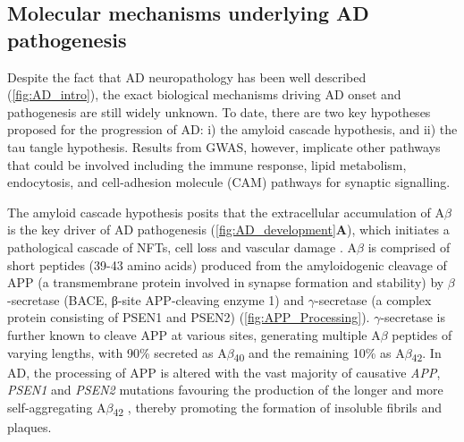 \subsection{Molecular mechanisms underlying AD pathogenesis}
\label{aetiologyAD}
Despite the fact that AD neuropathology has been well described (\cref{fig:AD_intro}), the exact biological mechanisms driving AD onset and pathogenesis are still widely unknown. To date, there are two key hypotheses proposed for the progression of AD: i) the amyloid cascade hypothesis, and ii) the tau tangle hypothesis. Results from GWAS, however, implicate other pathways that could be involved including the immune response, lipid metabolism, endocytosis, and cell-adhesion molecule (CAM) pathways for synaptic signalling.  

The amyloid cascade hypothesis posits that the extracellular accumulation of A$\beta$ is the key driver of AD pathogenesis (\cref{fig:AD_development}\textbf{A}), which initiates a pathological cascade of NFTs, cell loss and vascular damage \cite{Hardy1992}. A$\beta$ is comprised of short peptides (39-43 amino acids) \cite{J1987} produced from the amyloidogenic cleavage of APP (a transmembrane protein involved in synapse formation and stability) by $\beta$-secretase (BACE, β-site APP-cleaving enzyme 1) and $\gamma$-secretase (a complex protein consisting of PSEN1 and PSEN2) (\cref{fig:APP_Processing}).  $\gamma$-secretase is further known to cleave APP at various sites, generating multiple A$\beta$ peptides of varying lengths, with 90\% secreted as A$\beta$\textsubscript{40} and the remaining 10\% as A$\beta$\textsubscript{42}\cite{Asami-Odaka1995}. In AD, the processing of APP is altered with the vast majority of causative \textit{APP}, \textit{PSEN1} and \textit{PSEN2} mutations favouring the production of the longer and more self-aggregating A$\beta$\textsubscript{42} \cite{Li2019,D1996,JT1993}, thereby promoting the formation of insoluble fibrils and plaques\cite{JT1993}. 

